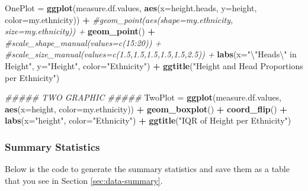 \documentclass[]{article}
\newenvironment{Shaded}{\begin{snugshade}}{\end{snugshade}}
\newcommand{\CharTok}[1]{\textcolor[rgb]{0.31,0.60,0.02}{#1}}
\newcommand{\CommentTok}[1]{\textcolor[rgb]{0.56,0.35,0.01}{\textit{#1}}}
\newcommand{\DataTypeTok}[1]{\textcolor[rgb]{0.13,0.29,0.53}{#1}}
\newcommand{\KeywordTok}[1]{\textcolor[rgb]{0.13,0.29,0.53}{\textbf{#1}}}
\newcommand{\NormalTok}[1]{#1}
\newcommand{\OperatorTok}[1]{\textcolor[rgb]{0.81,0.36,0.00}{\textbf{#1}}}
\newcommand{\StringTok}[1]{\textcolor[rgb]{0.31,0.60,0.02}{#1}}
\begin{document}
\begin{Shaded}
\begin{Highlighting}[]
\NormalTok{OnePlot =}\StringTok{ }\KeywordTok{ggplot}\NormalTok{(measure.df.values, }\KeywordTok{aes}\NormalTok{(}\DataTypeTok{x=}\NormalTok{height.heads, }\DataTypeTok{y=}\NormalTok{height, }\DataTypeTok{color=}\NormalTok{my.ethnicity)) }\OperatorTok{+}
\StringTok{  }\CommentTok{#geom_point(aes(shape=my.ethnicity, size=my.ethnicity)) +}
\StringTok{  }\KeywordTok{geom_point}\NormalTok{() }\OperatorTok{+}
\StringTok{  }\CommentTok{#scale_shape_manual(values=c(15:20)) +}
\StringTok{  }\CommentTok{#scale_size_manual(values=c(1.5,1.5,1.5,1.5,1.5,2.5)) +}
\StringTok{  }\KeywordTok{labs}\NormalTok{(}\DataTypeTok{x=}\StringTok{"}\CharTok{\textbackslash{}"}\StringTok{Heads}\CharTok{\textbackslash{}"}\StringTok{ in Height"}\NormalTok{, }\DataTypeTok{y=}\StringTok{"Height"}\NormalTok{, }\DataTypeTok{color=}\StringTok{"Ethnicity"}\NormalTok{) }\OperatorTok{+}
\StringTok{  }\KeywordTok{ggtitle}\NormalTok{(}\StringTok{"Height and Head Proportions per Ethnicity"}\NormalTok{)}

\CommentTok{##### TWO GRAPHIC #####}
\NormalTok{TwoPlot =}\StringTok{ }\KeywordTok{ggplot}\NormalTok{(measure.df.values, }\KeywordTok{aes}\NormalTok{(}\DataTypeTok{x=}\NormalTok{height, }\DataTypeTok{color=}\NormalTok{my.ethnicity)) }\OperatorTok{+}
\StringTok{  }\KeywordTok{geom_boxplot}\NormalTok{() }\OperatorTok{+}
\StringTok{  }\KeywordTok{coord_flip}\NormalTok{() }\OperatorTok{+}
\StringTok{  }\KeywordTok{labs}\NormalTok{(}\DataTypeTok{x=}\StringTok{"height"}\NormalTok{, }\DataTypeTok{color=}\StringTok{"Ethnicity"}\NormalTok{) }\OperatorTok{+}
\StringTok{  }\KeywordTok{ggtitle}\NormalTok{(}\StringTok{"IQR of Height per Ethnicity"}\NormalTok{)}
\end{Highlighting}
\end{Shaded}

\subsubsection{Summary Statistics}
\label{sec:appendix-setup2}

Below is the code to generate the summary statistics and save them as a
table that you see in Section \ref{sec:data-summary}.
\end{document}
